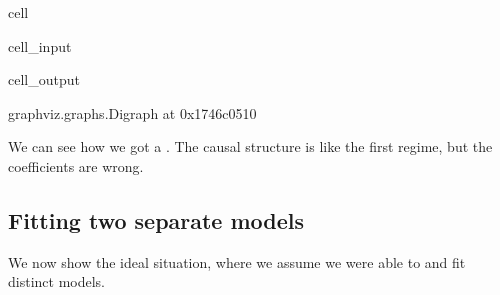 \documentclass[letterpaper,10pt,english]{jupyterBook}
\begin{document}
\begin{sphinxuseclass}{cell}\begin{sphinxVerbatimInput}

\begin{sphinxuseclass}{cell_input}
\begin{sphinxVerbatim}[commandchars=\\\{\}]
   
 

  
  
  

  
  
\end{sphinxVerbatim}

\end{sphinxuseclass}\end{sphinxVerbatimInput}
\begin{sphinxVerbatimOutput}

\begin{sphinxuseclass}{cell_output}
\begin{sphinxVerbatim}[commandchars=\\\{\}]
\PYGZlt{}graphviz.graphs.Digraph at 0x1746c0510\PYGZgt{}
\end{sphinxVerbatim}

\end{sphinxuseclass}\end{sphinxVerbatimOutput}

\end{sphinxuseclass}
\sphinxAtStartPar
We can see how we got a . The causal structure is like the first regime, but the coefficients are wrong.


\subsection{Fitting two separate models}
\label{\detokenize{notebooks/structural_breaks_example:fitting-two-separate-models}}
\sphinxAtStartPar
We now show the ideal situation, where we assume we were able to  and fit distinct models.
\end{document}
